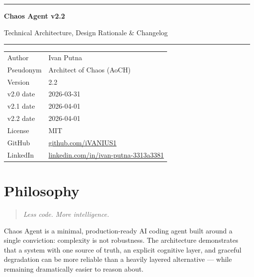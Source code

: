 \documentclass[11pt, a4paper]{article}
\begin{document}
\thispagestyle{empty}

\vspace*{18mm}
{\color{rule}\rule{\linewidth}{1.2pt}}
\vspace{6pt}

{\sffamily\Huge\bfseries\color{accent} Chaos Agent v2.2}

\vspace{4pt}
{\sffamily\large\color{note} Technical Architecture, Design Rationale \& Changelog}

\vspace{6pt}
{\color{rule}\rule{\linewidth}{0.4pt}}
\vspace{10mm}

\begin{tabular}{@{}ll}
  {\sffamily\small\color{note} Author}    & Ivan Putna \\
  {\sffamily\small\color{note} Pseudonym} & Architect of Chaos (AoCH) \\
  {\sffamily\small\color{note} Version}   & 2.2 \\
  {\sffamily\small\color{note} v2.0 date} & 2026-03-31 \\
  {\sffamily\small\color{note} v2.1 date} & 2026-04-01 \\
  {\sffamily\small\color{note} v2.2 date} & 2026-04-01 \\
  {\sffamily\small\color{note} License}   & MIT \\
  {\sffamily\small\color{note} GitHub}    &
    \href{https://github.com/iVANIUS1}{github.com/iVANIUS1} \\
  {\sffamily\small\color{note} LinkedIn}  &
    \href{https://www.linkedin.com/in/ivan-putna-3313a3381}{linkedin.com/in/ivan-putna-3313a3381} \\
\end{tabular}

\vspace{14mm}
\tableofcontents
\newpage

\section{Philosophy}

\begin{quote}
  \itshape Less code. More intelligence.
\end{quote}

Chaos Agent is a minimal, production-ready AI coding agent built around a single
conviction: complexity is not robustness. The architecture demonstrates that a
system with one source of truth, an explicit cognitive layer, and graceful
degradation can be more reliable than a heavily layered alternative — while
remaining dramatically easier to reason about.
\end{document}
